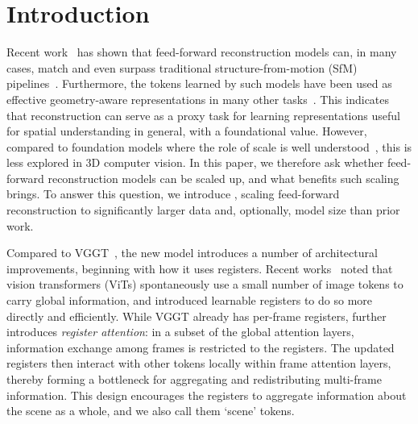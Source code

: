 \vspace{-8pt}
\section{Introduction}%
\label{sec:intro}



Recent work~\cite{wang24dust3r:, leroy24grounding, wang25vggt, wang25p3, lin25depth} has shown that feed-forward reconstruction models can, in many cases, match and even surpass traditional structure-from-motion (SfM) pipelines~\cite{hartley00multiple,snavely06photo,schonberger16structure-from-motion}.
Furthermore, the tokens learned by such models have been used as effective geometry-aware representations in many other tasks~\cite{li25spatial, abouzeid25geoaware-vla:, zeng25janusvln:,qian26xembodied:, zhang26spatialstack:, zhang26make, zheng25learning,bonnen26human-level,wang26let-geometry, huang26gen3r:, jang26repurposing, yang26cambrian-s:, szymanowicz26lagernvs,cao26vggt-det:, gao26vggt-segmentor:, zhao25spacemind:, yang25dense, vuong25improving, rao26augvla-3d:, zhou26generalizing, xu26vggt-mpr:, wu26mvggt:, lee253d-aware}.
This indicates that reconstruction can serve as a proxy task for learning representations useful for spatial understanding in general, with a foundational value.
However, compared to foundation models where the role of scale is well understood~\cite{simeoni25dinov3, kaplan20scaling, zhai22scaling}, this is less explored in 3D computer vision.
In this paper, we therefore ask whether feed-forward reconstruction models can be scaled up, and what benefits such scaling brings.
To answer this question, we introduce \method, scaling feed-forward reconstruction to significantly larger data and, optionally, model size than prior work.

Compared to VGGT~\cite{wang25vggt}, the new model introduces a number of architectural improvements, beginning with how it uses registers.
Recent works~\cite{darcet24vision, jiang25vision, marouani26revisiting} noted that vision transformers (ViTs) spontaneously use a small number of image tokens to carry global information, and introduced learnable registers to do so more directly and efficiently.
While VGGT already has per-frame registers, \method further introduces \emph{register attention}: in a subset of the global attention layers, information exchange among frames is restricted to the registers.
The updated registers then interact with other tokens locally within frame attention layers, thereby forming a bottleneck for aggregating and redistributing multi-frame information.
This design encourages the registers to aggregate information about the scene as a whole, and we also call them `scene' tokens.

